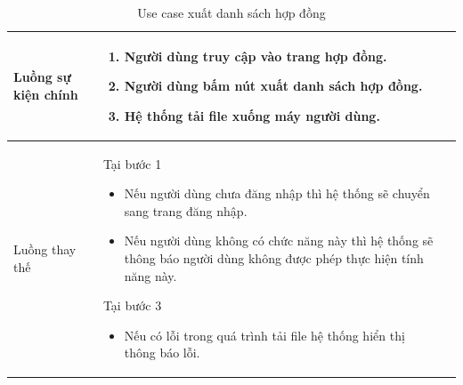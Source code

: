 \documentclass[12pt,a4paper]{article}
\begin{document}
\begin{table}[H]
\begin{tabular}{|p{3.5cm}|p{11.5cm}|c|}
            Luồng sự kiện chính & \vspace{-.8cm}\begin{enumerate}
                                                    \item Người dùng truy cập vào trang hợp đồng.
                                                    \item Người dùng bấm nút xuất danh sách hợp đồng.
                                                    \item Hệ thống tải file xuống máy người dùng.
            \end{enumerate}
            \\
            \hline
            Luồng thay thế & Tại bước 1\newline
            \vspace{-.8cm}\begin{itemize}
                              \item Nếu người dùng chưa đăng nhập thì hệ thống sẽ chuyển sang trang đăng nhập.
                              \item Nếu người dùng không có chức năng này thì hệ thống sẽ thông báo người dùng không được phép thực hiện tính năng này.
            \end{itemize}
            Tại bước 3\newline
            \vspace{-.8cm}\begin{itemize}
                              \item Nếu có lỗi trong quá trình tải file hệ thống hiển thị thông báo lỗi.
            \end{itemize}
            \\ \hline
        \end{tabular}
        \caption{Use case xuất danh sách hợp đồng}

    \end{table}


\end{document}
